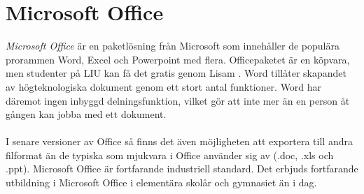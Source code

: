 \section{Microsoft Office}
\textit{Microsoft Office} är en paketlösning från Microsoft som innehåller de populära prorammen Word, Excel och Powerpoint med flera. Officepaketet är en köpvara, men studenter på LIU kan få det gratis genom Lisam \cite{website:liu_office_package}. Word tillåter skapandet av högteknologiska dokument genom ett stort antal funktioner. Word har däremot ingen inbyggd delningsfunktion, vilket gör att inte mer än en person åt gången kan jobba med ett dokument.
\\ \\
I senare versioner av Office så finns det även möjligheten att exportera till andra filformat än de typiska som mjukvara i Office använder sig av (.doc, .xls och .ppt). Microsoft Office är fortfarande industriell standard. Det erbjuds fortfarande utbildning i Microsoft Office i elementära skolår och gymnasiet än i dag.





